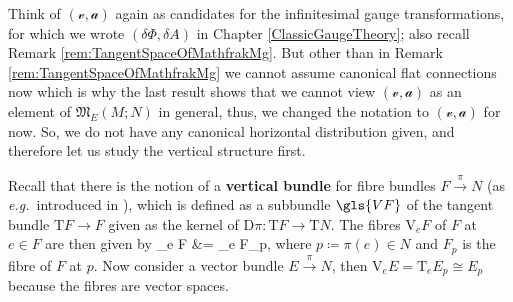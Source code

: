 Think of $(\mathcal{v}, \mathcal{a})$ again as candidates for the infinitesimal gauge transformations, for which we wrote $(\delta \Phi, \delta A)$ in Chapter \ref{ClassicGaugeTheory}; also recall Remark \ref{rem:TangentSpaceOfMathfrakMg}. But other than in Remark \ref{rem:TangentSpaceOfMathfrakMg} we cannot assume canonical flat connections now which is why the last result shows that we cannot view $(\mathcal{v}, \mathcal{a})$ as an element of $\mathfrak{M}_E(M;N)$ in general, thus, we changed the notation to $(\mathcal{v}, \mathcal{a})$ for now. So, we do not have any canonical horizontal distribution given, and therefore let us study the vertical structure first.

Recall that there is the notion of a \textbf{vertical bundle} for fibre bundles $F \stackrel{\pi}{\to} N$ (as \textit{e.g.}~introduced in \cite[\S 5.1.1, for principal bundles, but it is straightforward to extend the definitions]{hamilton}), which is defined as a subbundle $\gls{VF}$ of the tangent bundle $\mathrm{T}F \to F$ given as the kernel of $\mathrm{D}\pi : \mathrm{T}F \to \mathrm{T}N$. The fibres $\mathrm{V}_eF$ of $F$ at $e \in F$ are then given by 
\bas
{}_e F
&=
_e F_p,
\eas
where $p \coloneqq \pi(e) \in N$ and $F_p$ is the fibre of $F$ at $p$.
Now consider a vector bundle $E \stackrel{\pi}{\to} N$, then $\mathrm{V}_e E = \mathrm{T}_e E_p \cong E_p$ because the fibres are vector spaces.


